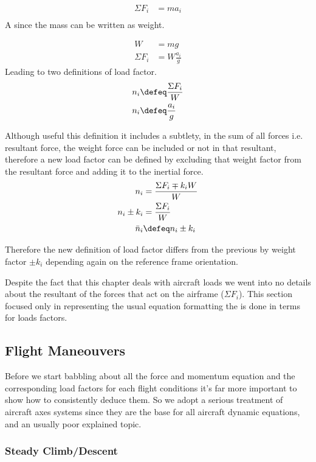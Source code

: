 \begin{align}
\Sigma F_i &= m a_i \\
\end{align}
A since the mass can be written as weight.



\begin{align}
W &= m g \\
\Sigma F_i &= W \frac{a_i}{g}
\end{align}
Leading to two definitions of load factor.
\begin{align}
n_i &\defeq \frac{\Sigma F_i}{W} \\
n_i &\defeq \frac{a_i}{g}
\end{align}

Although useful this definition it includes a subtlety, in the sum of all forces i.e. resultant force, the weight force can be included
or not in that resultant, therefore a new load factor can be defined by excluding that weight factor from the resultant force and adding it to the inertial force.
\begin{align}
    n_i &= \frac{\Sigma F_i \mp k_iW}{W} \\
    n_i \pm k_i &= \frac{\Sigma F_i}{W} \\
    \bar{n}_i &\defeq n_i \pm k_i
\end{align}

Therefore the new definition of load factor differs from the previous by weight factor $\pm k_i$ depending again on the reference frame orientation.

Despite the fact that this chapter deals with aircraft loads we went into no details about the resultant of the forces that act on the
airframe ($\Sigma F_i$). This section focused only in representing the usual equation formatting the is done in terms for loads factors.



\subsection{Flight Maneouvers}
Before we start babbling about all the force and momentum equation and the
corresponding load factors for each flight conditions it's far more important
to show how to consistently deduce them. So we adopt a serious treatment of aircraft axes systems since they are the base for
all aircraft dynamic equations, and an usually poor explained topic.

\subsubsection{Steady Climb/Descent}

